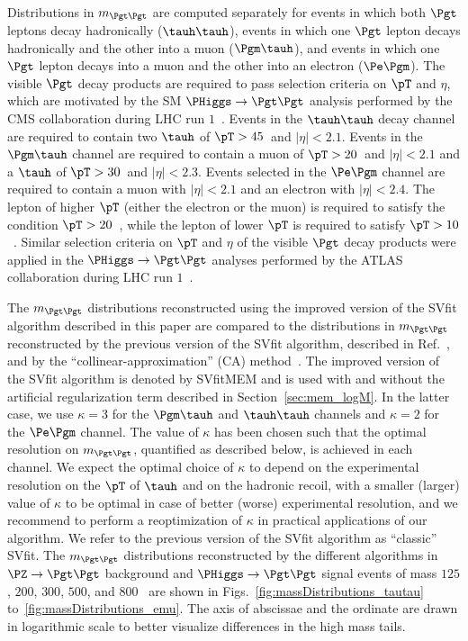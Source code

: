 Distributions in $m_{\Pgt\Pgt}$ are computed separately for events in which 
both $\Pgt$ leptons decay hadronically ($\tauh\tauh$), 
events in which one $\Pgt$ lepton decays hadronically and the other into a muon ($\Pgm\tauh$),
and events in which one $\Pgt$ lepton decays into a muon and the other into an electron ($\Pe\Pgm$).
The visible $\Pgt$ decay products are required to pass selection criteria on $\pT$ and $\eta$,
which are motivated by the SM $\PHiggs \to \Pgt\Pgt$ analysis performed by the CMS collaboration during LHC run $1$~\cite{HIG-13-004}.
Events in the $\tauh\tauh$ decay channel are required to contain
two $\tauh$ of $\pT > 45$~\GeV and $\vert\eta\vert < 2.1$.
Events in the $\Pgm\tauh$ channel
are required to contain a muon of $\pT > 20$~\GeV and $\vert\eta\vert < 2.1$ and a $\tauh$ of $\pT > 30$~\GeV and $\vert\eta\vert < 2.3$.
Events selected in the $\Pe\Pgm$ channel are required to contain a muon with $\vert\eta\vert < 2.1$ and an electron with $\vert\eta\vert < 2.4$.
The lepton of higher $\pT$ (either the electron or the muon) is required to satisfy the condition $\pT > 20$~\GeV,
while the lepton of lower $\pT$ is required to satisfy $\pT > 10$~\GeV.
Similar selection criteria on $\pT$ and $\eta$ of the visible $\Pgt$ decay products were applied in the $\PHiggs \to \Pgt\Pgt$
analyses performed by the ATLAS
collaboration during LHC run $1$~\cite{ATLAS_HiggsTauTau_SM,ATLAS_HiggsTauTau_MSSM}.

The $m_{\Pgt\Pgt}$ distributions reconstructed using the 
improved version of the SVfit algorithm described in this paper
are compared to the distributions in $m_{\Pgt\Pgt}$ reconstructed by the previous version of the
SVfit algorithm, described in Ref.~\cite{SVfit}, and by the ``collinear-approximation'' (CA)
method~\cite{massRecoCollinearApprox}.
The improved version of the SVfit algorithm is denoted by SVfitMEM 
and is used with and without the artificial regularization term described in Section~\ref{sec:mem_logM}.
In the latter case, we use $\kappa = 3$ for the $\Pgm\tauh$ and $\tauh\tauh$ channels and $\kappa = 2$ for the $\Pe\Pgm$ channel.
The value of $\kappa$ has been chosen such that the optimal resolution on $m_{\Pgt\Pgt}$, quantified as described below, is achieved in each channel.
We expect the optimal choice of $\kappa$ to depend on the experimental resolution on the $\pT$ of $\tauh$ and on the hadronic recoil,
with a smaller (larger) value of $\kappa$ to be optimal in case of better (worse) experimental resolution,
and we recommend to perform a reoptimization of $\kappa$ in practical applications of our algorithm.
We refer to the previous version of the SVfit algorithm as ``classic'' SVfit.
The $m_{\Pgt\Pgt}$ distributions reconstructed by the different algorithms
in $\PZ \to \Pgt\Pgt$ background and $\PHiggs \to \Pgt\Pgt$ signal events
of mass $125$, $200$, $300$, $500$, and $800$~\GeV
are shown in Figs.~\ref{fig:massDistributions_tautau} to~\ref{fig:massDistributions_emu}.
The axis of abscissae and the ordinate are drawn in logarithmic scale to better visualize differences in the high mass tails.

